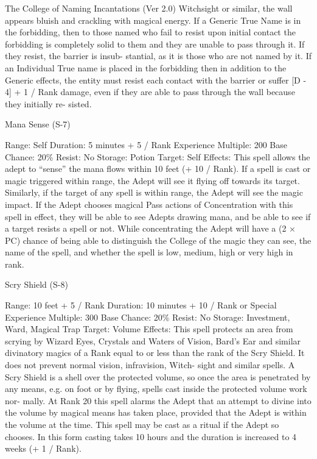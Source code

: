 \begin{Chapter}{The College of Naming Incantations (Ver 2.0)}
Witchsight  or  similar,  the  wall  appears  bluish  and 
crackling  with  magical  energy.  If  a  Generic  True 
Name  is  in  the  forbidding,  then  to  those  named 
who fail to resist upon initial contact the forbidding 
is completely solid to them and they  are unable to 
pass through  it.  If  they  resist,  the  barrier  is  insub-
stantial, as it is those who are not named by it. If an 
Individual  True  name  is  placed  in  the  forbidding 
then  in  addition  to  the  Generic  effects,  the  entity 
must  resist  each  contact  with  the  barrier  or  suffer 
[D - 4] + 1 / Rank damage, even if they are able to 
pass  through  the  wall  because  they  initially  re-
sisted. 

Mana Sense (S-7) 

Range: Self 
Duration: 5 minutes + 5 / Rank 
Experience Multiple: 200 
Base Chance: 20\% 
Resist: No 
Storage: Potion 
Target: Self 
Effects:  This  spell  allows  the  adept  to  “sense”  the 
mana flows within 10 feet (+ 10 / Rank). If a spell 
is  cast  or  magic  triggered  within  range,  the  Adept 
will see it flying off towards its target. Similarly, if 
the  target  of  any  spell  is  within  range,  the  Adept 
will  see  the  magic  impact.  If  the  Adept  chooses 
magical  Pass  actions  of  Concentration  with  this 
spell  in  effect,  they  will  be  able  to  see  Adepts 
drawing mana, and be able to see if a target resists 
a  spell  or  not.  While  concentrating  the  Adept  will 
have a (2 × PC) chance of being able to distinguish 
the College of the magic they can see, the name of 
the  spell,  and  whether  the  spell  is  low,  medium, 
high or very high in rank. 

Scry Shield (S-8) 

Range: 10 feet + 5 / Rank 
Duration: 10 minutes + 10 / Rank or Special 
Experience Multiple: 300 
Base Chance: 20\% 
Resist: No 
Storage: Investment, Ward, Magical Trap 
Target: Volume 
Effects: This spell protects an area from scrying by 
Wizard  Eyes,  Crystals  and  Waters  of  Vision, 
Bard’s Ear and similar divinatory magics of a Rank 
equal to or less than the rank of the Scry Shield. It 
does not prevent normal vision, infravision, Witch-
sight  and  similar  spells.  A  Scry  Shield  is  a  shell 
over  the  protected  volume,  so  once  the  area  is 
penetrated by any means, e.g. on foot or by flying, 
spells  cast  inside  the  protected  volume  work  nor-
mally. At Rank 20 this spell alarms the Adept that 
an  attempt  to  divine  into  the  volume  by  magical 
means  has  taken  place,  provided  that  the  Adept  is 
within  the  volume  at  the  time.  This  spell  may  be 
cast as a ritual if the Adept so chooses. In this form 
casting takes 10 hours and the duration is increased 
to 4 weeks (+ 1 / Rank). 


\end{Chapter}
